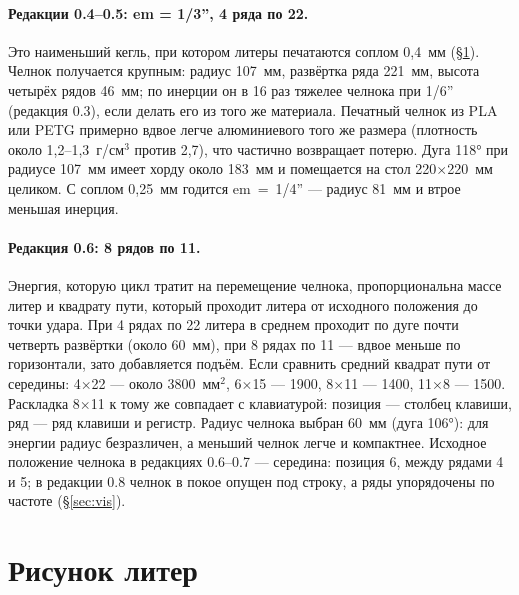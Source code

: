 
\paragraph{Редакции 0.4--0.5: em = 1/3'', 4 ряда по 22.} Это наименьший кегль, при котором литеры печатаются соплом 0,4~мм (\S\ref{sec:glyphs}). Челнок получается крупным: радиус 107~мм, развёртка ряда 221~мм, высота четырёх рядов 46~мм; по инерции он в 16 раз тяжелее челнока при 1/6'' (редакция 0.3), если делать его из того же материала. Печатный челнок из PLA или PETG примерно вдвое легче алюминиевого того же размера (плотность около 1,2–1,3~г/см$^3$ против 2,7), что частично возвращает потерю. Дуга 118° при радиусе 107~мм имеет хорду около 183~мм и помещается на стол 220$\times$220~мм целиком. С соплом 0,25~мм годится em~=~1/4'' — радиус 81~мм и втрое меньшая инерция.

\paragraph{Редакция 0.6: 8 рядов по 11.} Энергия, которую цикл тратит на перемещение челнока, пропорциональна массе литер и квадрату пути, который проходит литера от исходного положения до точки удара. При 4 рядах по 22 литера в среднем проходит по дуге почти четверть развёртки (около 60~мм), при 8 рядах по 11 — вдвое меньше по горизонтали, зато добавляется подъём. Если сравнить средний квадрат пути от середины: 4$\times$22 — около 3800~мм$^2$, 6$\times$15 — 1900, 8$\times$11 — 1400, 11$\times$8 — 1500. Раскладка 8$\times$11 к тому же совпадает с клавиатурой: позиция — столбец клавиши, ряд — ряд клавиши и регистр. Радиус челнока выбран 60~мм (дуга 106°): для энергии радиус безразличен, а меньший челнок легче и компактнее. Исходное положение челнока в редакциях 0.6--0.7 — середина: позиция 6, между рядами 4 и 5; в редакции 0.8 челнок в покое опущен под строку, а ряды упорядочены по частоте (\S\ref{sec:vis}).

\section{Рисунок литер}
\label{sec:glyphs}

